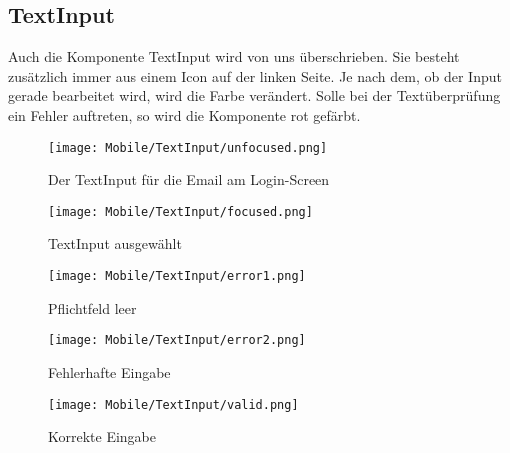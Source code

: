 \newpage
\subsection{TextInput}
Auch die Komponente TextInput wird von uns überschrieben. Sie besteht zusätzlich immer aus einem
Icon auf der linken Seite. Je nach dem, ob der Input gerade bearbeitet wird, wird die Farbe
verändert. Solle bei der Textüberprüfung ein Fehler auftreten, so wird die Komponente rot gefärbt.

\begin{figure}[H]
  \begin{center}
    \texttt{[image: Mobile/TextInput/unfocused.png]}
    \caption{Der TextInput für die Email am Login-Screen}
  \end{center}
\end{figure}

\begin{figure}[H]
  \begin{center}
    \texttt{[image: Mobile/TextInput/focused.png]}
    \caption{TextInput ausgewählt}
  \end{center}
\end{figure}

\begin{figure}[H]
  \begin{center}
    \texttt{[image: Mobile/TextInput/error1.png]}
    \caption{Pflichtfeld leer}
  \end{center}
\end{figure}

\begin{figure}[H]
  \begin{center}
    \texttt{[image: Mobile/TextInput/error2.png]}
    \caption{Fehlerhafte Eingabe}
  \end{center}
\end{figure}

\begin{figure}[H]
  \begin{center}
    \texttt{[image: Mobile/TextInput/valid.png]}
    \caption{Korrekte Eingabe}
  \end{center}
\end{figure}